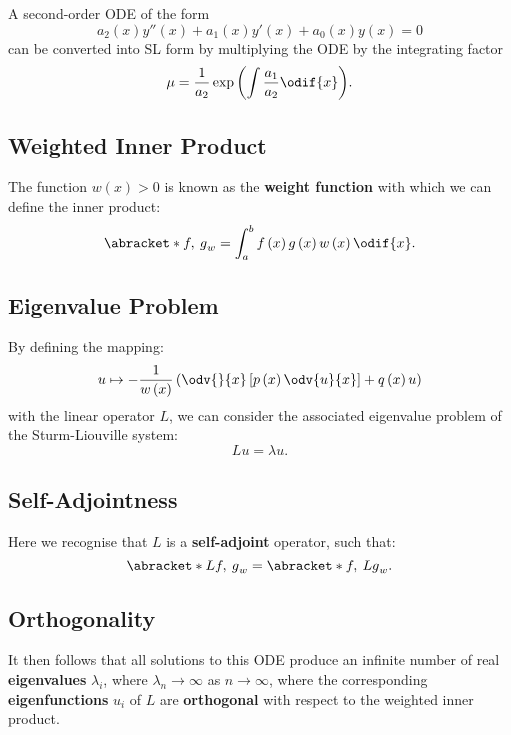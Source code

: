 \documentclass{article}
\begin{document}
A second-order ODE of the form
\begin{equation*}
    a_2\left( x \right) y''\left( x \right) + a_1\left( x \right) y'\left( x \right) + a_0\left( x \right) y\left( x \right) = 0
\end{equation*}
can be converted into SL form by multiplying the ODE by the integrating factor
\begin{equation*}
    \mu = \frac{1}{a_2} \exp{\left( \int \frac{a_1}{a_2} \odif{x} \right)}.
\end{equation*}
\subsection{Weighted Inner Product}
The function \(w\left( x \right) > 0\) is known as the \textbf{weight
function} with which we can define the inner product:
\begin{equation*}
    \abracket*{f,\: g}_{w} = \int_a^b f\left( x \right) g\left( x \right) w\left( x \right) \odif{x}.
\end{equation*}
\subsection{Eigenvalue Problem}
By defining the mapping:
\begin{equation*}
    u \mapsto - \frac{1}{w\left( x \right)} \left( \odv{}{x} \left[ p\left( x \right) \odv{u}{x} \right] + q\left( x \right) u \right)
\end{equation*}
with the linear operator \(L\), we can consider the associated eigenvalue problem of
the Sturm-Liouville system:
\begin{equation*}
    L u = \lambda u.
\end{equation*}
\subsection{Self-Adjointness}
Here we recognise that \(L\) is a \textbf{self-adjoint} operator, such
that:
\begin{equation*}
    \abracket*{Lf,\: g}_{w} = \abracket*{f,\: Lg}_{w}.
\end{equation*}
\subsection{Orthogonality}
It then follows that all solutions to this ODE produce an infinite
number of real \textbf{eigenvalues} \(\lambda_i\), where \(\lambda_n
\to \infty\) as \(n \to \infty\), where the corresponding
\textbf{eigenfunctions} \(u_i\) of \(L\) are \textbf{orthogonal} with
respect to the weighted inner product.
\end{document}
